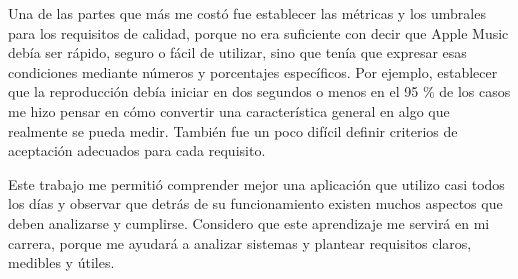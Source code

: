 \documentclass[conference,onecolumn]{IEEEtran}
\begin{document}
Una de las partes que más me costó fue establecer las métricas y los umbrales para los requisitos de calidad, porque no era suficiente con decir que Apple Music debía ser rápido, seguro o fácil de utilizar, sino que tenía que expresar esas condiciones mediante números y porcentajes específicos. Por ejemplo, establecer que la reproducción debía iniciar en dos segundos o menos en el 95 \% de los casos me hizo pensar en cómo convertir una característica general en algo que realmente se pueda medir. También fue un poco difícil definir criterios de aceptación adecuados para cada requisito.

Este trabajo me permitió comprender mejor una aplicación que utilizo casi todos los días y observar que detrás de su funcionamiento existen muchos aspectos que deben analizarse y cumplirse. Considero que este aprendizaje me servirá en mi carrera, porque me ayudará a analizar sistemas y plantear requisitos claros, medibles y útiles.

\printbibliography[title={Referencias}]
\end{document}
